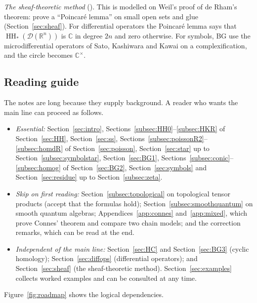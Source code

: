 \documentclass[11pt,oneside,reqno]{article}
\DeclareMathOperator{\HH}{HH}
\newcommand{\C}{\mathbb C}
\newcommand{\R}{\mathbb R}
\newcommand{\cD}{\mathcal D}
\theoremstyle{plain}
\theoremstyle{definition}
\theoremstyle{remark}
\begin{document}
\emph{The sheaf-theoretic method} (\cite[\S5]{BG}). This is modelled on
Weil's proof of de Rham's theorem: prove a ``Poincaré lemma'' on small
open sets and glue (Section~\ref{sec:sheaf}). For differential operators
the Poincaré lemma says that \(\HH_*(\cD(\R^n))\) is \(\C\) in degree
\(2n\) and zero otherwise. For symbols, BG use the microdifferential
operators of Sato, Kashiwara and Kawai on a complexification, and the
circle becomes \(\C^\times\).

\subsection{Reading guide}\label{subsec:reading}
The notes are long because they supply background. A reader who wants the
main line can proceed as follows.
\begin{itemize}
\item \emph{Essential:} Section~\ref{sec:intro}, Sections~\ref{subsec:HH0}--\ref{subsec:HKR}
of Section~\ref{sec:HH}, Section~\ref{sec:ss}, Sections~\ref{subsec:poissonR2}--\ref{subsec:homdR}
of Section~\ref{sec:poisson}, Section~\ref{sec:star} up to
Section~\ref{subsec:symbolstar}, Section~\ref{sec:BG1},
Sections~\ref{subsec:conic}--\ref{subsec:homog} of Section~\ref{sec:BG2},
Section~\ref{sec:symbols} and Section~\ref{sec:residue} up to
Section~\ref{subsec:zeta}.
\item \emph{Skip on first reading:} Section~\ref{subsec:topological} on
topological tensor products (accept that the formulas hold);
Section~\ref{subsec:smoothquantum} on smooth quantum algebras;
Appendices~\ref{app:connes} and~\ref{app:mixed}, which prove Connes'
theorem and compare two chain models; and the correction remarks, which
can be read at the end.
\item \emph{Independent of the main line:} Section~\ref{sec:HC} and
Section~\ref{sec:BG3} (cyclic homology); Section~\ref{sec:diffops}
(differential operators); and Section~\ref{sec:sheaf} (the sheaf-theoretic
method). Section~\ref{sec:examples} collects worked examples and can be
consulted at any time.
\end{itemize}
Figure~\ref{fig:roadmap} shows the logical dependencies.
\end{document}
